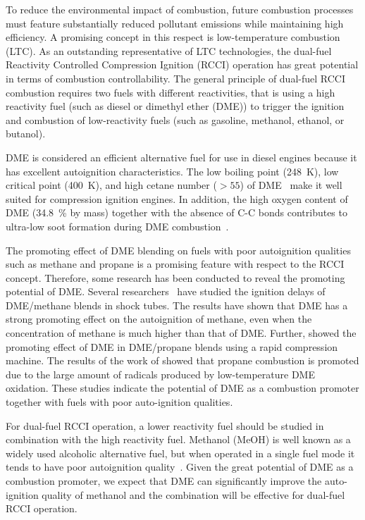 \documentclass[12pt]{../ussci}
\begin{document}
To reduce the environmental impact of combustion, future combustion processes
must feature substantially reduced pollutant emissions while maintaining high
efficiency. A promising concept in this respect is low-temperature combustion
(LTC). As an outstanding representative of LTC technologies, the dual-fuel
Reactivity Controlled Compression Ignition (RCCI) operation has great potential
in terms of combustion controllability. The general principle of dual-fuel RCCI
combustion requires two fuels with different reactivities, that is using a high
reactivity fuel (such as diesel or dimethyl ether (DME)) to trigger the ignition
and combustion of low-reactivity fuels (such as gasoline, methanol, ethanol, or
butanol).

DME is considered an efficient alternative fuel for use in diesel engines
because it has excellent autoignition characteristics. The low boiling point
(\SI{248}{\K}), low critical point (\SI{400}{\K}), and high cetane number (\(>
55\)) of DME~\autocite{Arcoumanis2008,Teng2001} make it well suited for
compression ignition engines. In addition, the high oxygen content of DME
(\SI{34.8}{\percent} by mass) together with the absence of C-C bonds
contributes to ultra-low soot formation during DME
combustion~\autocite{Arcoumanis2008}.

The promoting effect of DME blending on fuels with poor autoignition qualities
such as methane and propane is a promising feature with respect to the RCCI
concept. Therefore, some research has been conducted to reveal the promoting
potential of DME. Several researchers~\autocite{Burke2015a,Tang2012a,Chen2007a}
have studied the ignition delays of DME/methane blends in shock tubes. The
results have shown that DME has a strong promoting effect on the autoignition of
methane, even when the concentration of methane is much higher than that of DME.
Further, \textcite{Dames2016} showed the promoting effect of DME in DME/propane
blends using a rapid compression machine. The results of the work of
\textcite{Dames2016} showed that propane combustion is promoted due to the large
amount of radicals produced by low-temperature DME oxidation. These studies
indicate the potential of DME as a combustion promoter together with fuels with
poor auto-ignition qualities.

For dual-fuel RCCI operation, a lower reactivity fuel should be studied in
combination with the high reactivity fuel. Methanol (MeOH) is well known as a
widely used alcoholic alternative fuel, but when operated in a single fuel mode
it tends to have poor autoignition quality~\autocite{Siebers1987}. Given the
great potential of DME as a combustion promoter, we expect that DME can
significantly improve the auto-ignition quality of methanol and the combination
will be effective for dual-fuel RCCI operation.
\end{document}
